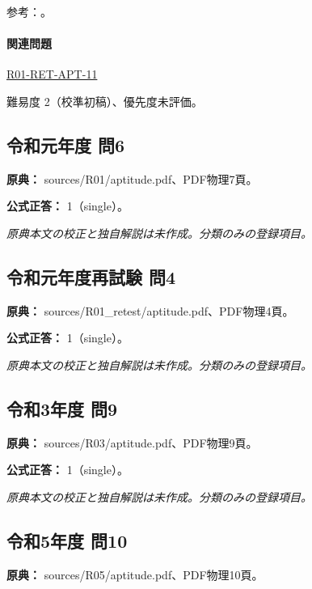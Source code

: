 \par 参考：\cite{env_offset2008,env_development,env_zero2008,env_accumulation}。

\paragraph{関連問題} \hyperref[q:r01-ret-apt-11]{R01-RET-APT-11}

\par 難易度 2（校準初稿）、優先度未評価。

\subsection{令和元年度 問6}
\label{q:r01-reg-apt-06}

\noindent\textbf{原典：} sources/R01/aptitude.pdf、PDF物理7頁。

\textbf{公式正答：} 1（single）。

\par\textit{原典本文の校正と独自解説は未作成。分類のみの登録項目。}

\subsection{令和元年度再試験 問4}
\label{q:r01-ret-apt-04}

\noindent\textbf{原典：} sources/R01\_retest/aptitude.pdf、PDF物理4頁。

\textbf{公式正答：} 1（single）。

\par\textit{原典本文の校正と独自解説は未作成。分類のみの登録項目。}

\subsection{令和3年度 問9}
\label{q:r03-reg-apt-09}

\noindent\textbf{原典：} sources/R03/aptitude.pdf、PDF物理9頁。

\textbf{公式正答：} 1（single）。

\par\textit{原典本文の校正と独自解説は未作成。分類のみの登録項目。}

\subsection{令和5年度 問10}
\label{q:r05-reg-apt-10}

\noindent\textbf{原典：} sources/R05/aptitude.pdf、PDF物理10頁。

